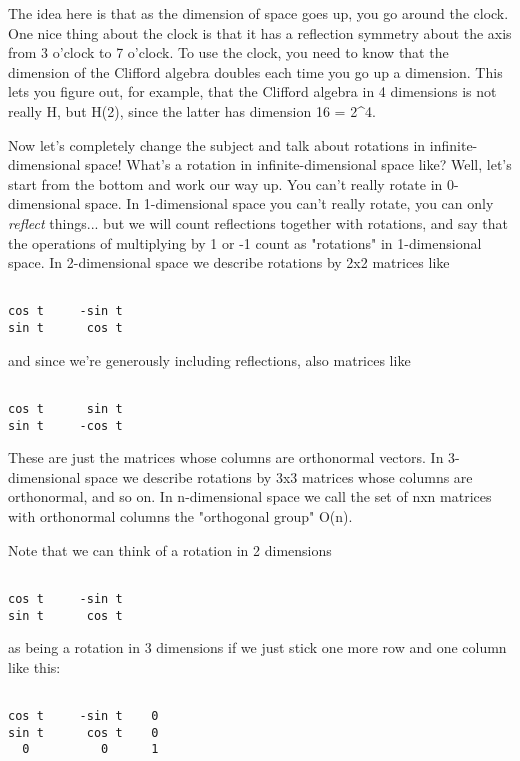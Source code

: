 The idea here is that as the dimension of space goes up, you go around
the clock.  One nice thing about the clock is that it has a reflection
symmetry about the axis from 3 o'clock to 7 o'clock.  To use the
clock, you need to know that the dimension of the Clifford algebra
doubles each time you go up a dimension.  This lets you figure out,
for example, that the Clifford algebra in 4 dimensions is not really
H, but H(2), since the latter has dimension 16 = 2^{4}.

Now let's completely change the subject and talk about rotations
in infinite-dimensional space!  What's a rotation in infinite-dimensional 
space like?  Well, let's start from the bottom and work our way up.
You can't really rotate in 0-dimensional space.  In 1-dimensional
space you can't really rotate, you can only \emph{reflect} things... but we
will count reflections together with rotations, and say that the
operations of multiplying by 1 or -1 count as "rotations" in
1-dimensional space.  In 2-dimensional space we describe rotations by
2x2 matrices like


\begin{verbatim}

cos t     -sin t
sin t      cos t
\end{verbatim}
    
and since we're generously including reflections, also matrices like


\begin{verbatim}

cos t      sin t
sin t     -cos t
\end{verbatim}
    
These are just the matrices whose columns are orthonormal vectors.  In
3-dimensional space we describe rotations by 3x3 matrices whose
columns are orthonormal, and so on.  In n-dimensional space we call
the set of nxn matrices with orthonormal columns the "orthogonal
group" O(n).  

Note that we can think of a rotation in 2 dimensions


\begin{verbatim}

cos t     -sin t
sin t      cos t
\end{verbatim}
    
as being a rotation in 3 dimensions if we just stick one more row and one
column like this:


\begin{verbatim}

cos t     -sin t    0
sin t      cos t    0
  0          0      1
\end{verbatim}
    
